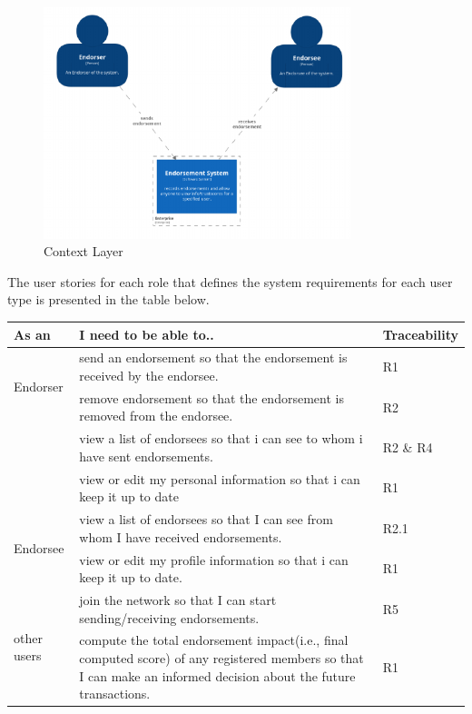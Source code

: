 \begin{figure}
	\centering
	\includegraphics[width=0.8\textwidth]{Images/1SystemContext.eps}
	\caption{Context Layer}
\end{figure}
The user stories for each role that defines the system requirements for each
user type is presented in the table below. 
\begin{center}
	\begin{tabular} {| l | p{9cm} | l |}
		\hline
		\textbf{As an}  & \textbf{I need to be able to..}   & \textbf{Traceability} \\
		\hline
		\multirow{2}{*}{Endorser} & send an endorsement so that the endorsement
		is received by the endorsee.& R1
		\\\cline{2-3} 
		& remove endorsement so that the endorsement is removed from the
		endorsee.  & R2 \\\cline{2-3}
		& view a list of endorsees so that i can see to whom i have sent
		endorsements.& R2 \& R4 \\\cline{2-3}
		& view or edit my personal information so that i can keep it up to
		date& R1 \\\cline{2-3}
		\hline
		\multirow{2}{*}{Endorsee} & view a list of endorsees so that I can see
		from whom I have received endorsements.& R2.1 \\\cline{2-3}
		& view or edit my profile information so that i can keep it up to date.
		& R1 \\\cline{2-3}
		\hline
		\multirow{2}{*}{other users} & join the network so that I can start
		sending/receiving endorsements. & R5 \\\cline{2-3}
		& compute the total endorsement impact(i.e., final computed score) of
		any registered members so that I can make an informed decision about
		the future transactions. 
		& R1 \\\cline{2-3}
		\hline
	\end{tabular}
\end{center}

